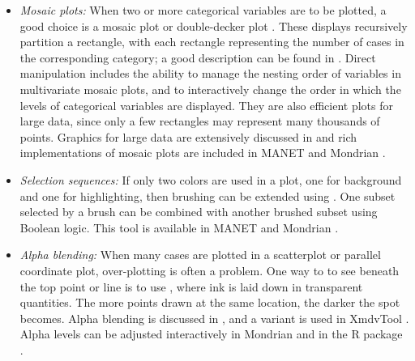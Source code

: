 \begin{itemize}
% 

 
 
\item {\em Mosaic plots:} When two or more categorical variables are
to be plotted, a good choice is a mosaic plot \cite{HK81} or
double-decker plot \cite{Ho01}. These displays recursively partition a
rectangle, with each rectangle representing the number of cases in the
corresponding category; a good description can be found in
.  Direct manipulation includes the ability to manage
the nesting order of variables in multivariate mosaic plots, and to
interactively change the order in which the levels of categorical
variables are displayed. They are also efficient plots for large data,
since only a few rectangles may represent many thousands of points.
Graphics for large data are extensively discussed in
 and rich implementations of mosaic plots are
included in MANET \cite{UHS96} and Mondrian \cite{Theus02}.

\item {\em Selection sequences:} If only two colors are used in a
plot, one for background and one for highlighting, then brushing can
be extended using  \cite{HT98}. One subset
selected by a brush can be combined with another brushed subset using
Boolean logic. This tool is available in MANET \cite{UHS96} and
Mondrian \cite{Theus02}.

\item {\em Alpha blending:} When many cases are plotted in a
scatterplot or parallel coordinate plot, over-plotting is often a
problem.  One way to to see beneath the top point or line is to use
, where ink is laid down in transparent
quantities.  The more points drawn at the same location, the darker
the spot becomes. Alpha blending is discussed in ,
and a variant is used in XmdvTool \cite{FWR99}.  Alpha levels can be
adjusted interactively in Mondrian and in the R package
 \cite{iPlots03}.


\end{itemize}
